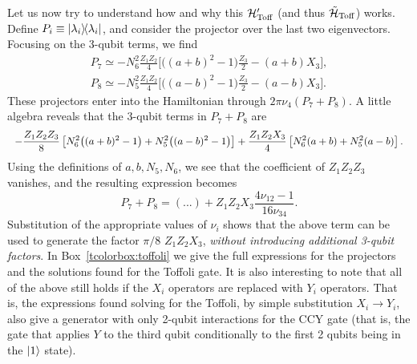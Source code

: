 Let us now try to understand how and why this ${\mathcal{H}}'_{\operatorname{Toff}}$ (and thus $\tilde{{\mathcal{H}}}_{\operatorname{Toff}}$) works.
Define $P_i \equiv \ketbra{\lambda_i}$,
and consider the projector over the last two eigenvectors.
Focusing on the 3-qubit terms, we find
\begin{equation}
\begin{aligned}
	P_7 \simeq - N_6^2 \frac{Z_1 Z_2}{4} \bigg[
		\big((a + b)^2 - 1\big) \frac{Z_3}{2}
		- (a + b) X_3
	\bigg], \\
	P_8 \simeq - N_5^2 \frac{Z_1 Z_2}{4} \bigg[
		\big((a - b)^2 - 1\big) \frac{Z_3}{2}
		- (a - b) X_3
	\bigg].
\end{aligned}
\end{equation}
These projectors enter into the Hamiltonian through $2\pi \nu_{4} (P_7 + P_8)$.
A little algebra reveals that the 3-qubit terms in $P_7 + P_8$ are
\begin{equation}\scalebox{0.92}{$\displaystyle
    - \frac{Z_1 Z_2 Z_3}{8} \left[
        N_6^2\big((a+b)^2 - 1\big)
        + N_5^2 \big((a-b)^2 - 1\big)
    \right]
    + \frac{Z_1 Z_2 X_3}{4} \left[
        N_6^2(a+b) + N_5^2(a-b)
    \right].
$}\end{equation}
Using the definitions of $a,b,N_5,N_6$, we see that the coefficient of $Z_1 Z_2 Z_3$ vanishes, and the resulting expression becomes
\begin{equation}
	P_7 + P_8 = (...) +
	Z_1 Z_2 X_3 \frac{4\nu_{12}-1}{16\nu_{34}}.
\end{equation}
Substitution of the appropriate values of $\nu_i$ shows that the above term can be used to generate the factor $\pi/8 \,\,Z_1 Z_2 X_3$,
\emph{without introducing additional 3-qubit factors}.
In Box~\ref{tcolorbox:toffoli} we give the full expressions for the projectors and the solutions found for the Toffoli gate.
It is also interesting to note that all of the above still holds if the $X_i$ operators are replaced with $Y_i$ operators.
That is, the expressions found solving for the Toffoli, by simple substitution $X_i \to Y_i$,
also give a generator with only 2-qubit interactions for the CCY gate
(that is, the gate that applies $Y$ to the third qubit conditionally to the first 2 qubits being in the $\ket1$ state).

